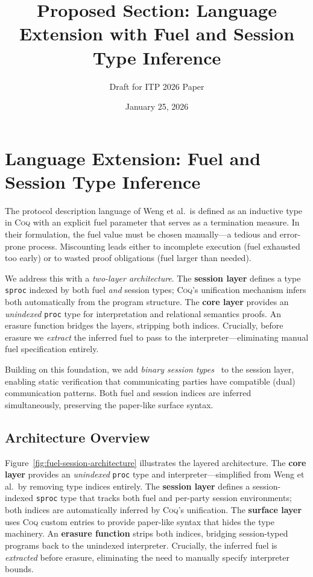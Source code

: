 \documentclass[11pt]{article}
\newcommand{\coqin}[1]{\texttt{#1}}
\newcommand{\coq}{\textsc{Coq}}
\begin{document}
\title{Proposed Section: Language Extension with Fuel and Session Type Inference}
\author{Draft for ITP 2026 Paper}
\date{January 25, 2026}
\maketitle


\section{Language Extension: Fuel and Session Type Inference}
\label{sec:fuel-session-inference}

The protocol description language of Weng et al.\ is defined as an inductive
type in \coq{} with an explicit fuel parameter that serves as a termination
measure. In their formulation, the fuel value must be chosen manually---a
tedious and error-prone process. Miscounting leads either to incomplete
execution (fuel exhausted too early) or to wasted proof obligations
(fuel larger than needed).

We address this with a \emph{two-layer architecture}. The \textbf{session
layer} defines a type \coqin{sproc} indexed by both fuel \emph{and} session
types; \coq{}'s unification mechanism infers both automatically from the
program structure. The \textbf{core layer} provides an \emph{unindexed}
\coqin{proc} type for interpretation and relational semantics proofs.
An erasure function bridges the layers, stripping both indices. Crucially,
before erasure we \emph{extract} the inferred fuel to pass to the
interpreter---eliminating manual fuel specification entirely.

Building on this foundation, we add \emph{binary session types}~\cite{honda1998}
to the session layer, enabling static verification that communicating parties
have compatible (dual) communication patterns. Both fuel and session indices
are inferred simultaneously, preserving the paper-like surface syntax.

\subsection{Architecture Overview}

Figure~\ref{fig:fuel-session-architecture} illustrates the layered architecture.
The \textbf{core layer} provides an \emph{unindexed} \coqin{proc} type and
interpreter---simplified from Weng et al.\ by removing type indices entirely.
The \textbf{session layer} defines a session-indexed \coqin{sproc} type that
tracks both fuel and per-party session environments; both indices are
automatically inferred by \coq{}'s unification. The \textbf{surface layer}
uses \coq{} custom entries to provide paper-like syntax that hides the type
machinery. An \textbf{erasure function} strips both indices, bridging
session-typed programs back to the unindexed interpreter. Crucially, the
inferred fuel is \emph{extracted} before erasure, eliminating the need
to manually specify interpreter bounds.
\end{document}
